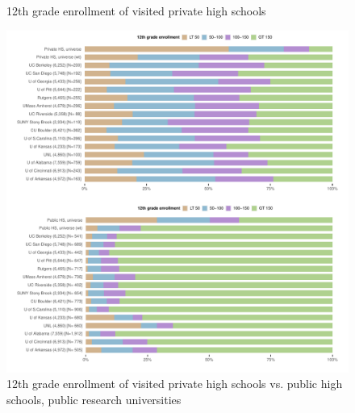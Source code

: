 \documentclass[
]{article}
\begin{document}
\begin{landscape}
\begin{figure}
{}

\caption{12th grade enrollment of visited private high schools}\label{fig:enroll-pubu-privu}
\end{figure}

\newpage

\begin{figure}

{\centering \includegraphics[width=2\linewidth]{../assets/figures/ego_network_enroll_pubu_privhs_pubhs} 

}

\caption{12th grade enrollment of visited private high schools vs. public high schools, public research universities}\label{fig:enroll-pubu-privhs-pubhs}
\end{figure}

\end{landscape}

\restoregeometry
\end{document}

